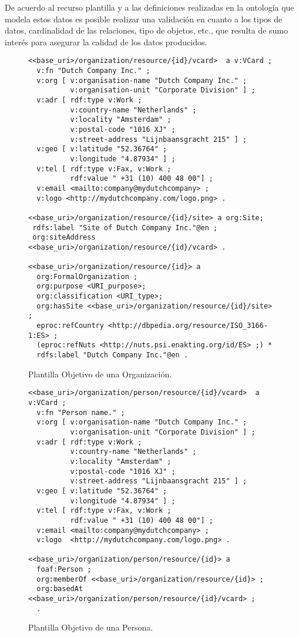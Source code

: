 De acuerdo al recurso plantilla y a las definiciones realizadas en la ontología que modela estos datos 
es posible realizar una validación en cuanto a los tipos de datos, cardinalidad de las relaciones, tipo de objetos, etc., que 
resulta de sumo interés para asegurar la calidad de los datos producidos.
\begin{figure}[!htp]
\begin{lstlisting} 
<<base_uri>/organization/resource/{id}/vcard>  a v:VCard ;
  v:fn "Dutch Company Inc." ;
  v:org [ v:organisation-name "Dutch Company Inc." ;
          v:organisation-unit "Corporate Division" ] ;
  v:adr [ rdf:type v:Work ;
          v:country-name "Netherlands" ;
          v:locality "Amsterdam" ;
          v:postal-code "1016 XJ" ;
          v:street-address "Lijnbaansgracht 215" ] ;
  v:geo [ v:latitude "52.36764" ;
          v:longitude "4.87934" ] ;
  v:tel [ rdf:type v:Fax, v:Work ;
          rdf:value " +31 (10) 400 48 00"] ; 
  v:email <mailto:company@mydutchcompany> ;
  v:logo <http://mydutchcompany.com/logo.png> .

<<base_uri>/organization/resource/{id}/site> a org:Site;
 rdfs:label "Site of Dutch Company Inc."@en ;
 org:siteAddress <<base_uri>/organization/resource/{id}/vcard> .

<<base_uri>/organization/resource/{id}> a 
  org:FormalOrganization ;   
  org:purpose <URI_purpose>;
  org:classification <URI_type>;
  org:hasSite <<base_uri>/organization/resource/{id}/site> ;
  eproc:refCountry <http://dbpedia.org/resource/ISO_3166-1:ES> ;
  (eproc:refNuts <http://nuts.psi.enakting.org/id/ES> ;) *
  rdfs:label "Dutch Company Inc."@en .
\end{lstlisting}
	\caption{Plantilla Objetivo de una Organización.}
	\label{fig:orgs-template}
\end{figure}


\begin{figure}[!htp]
\begin{lstlisting} 
<<base_uri>/organization/person/resource/{id}/vcard>  a v:VCard ;
  v:fn "Person name." ;
  v:org [ v:organisation-name "Dutch Company Inc." ;
          v:organisation-unit "Corporate Division" ] ;
  v:adr [ rdf:type v:Work ;
          v:country-name "Netherlands" ;
          v:locality "Amsterdam" ;
          v:postal-code "1016 XJ" ;
          v:street-address "Lijnbaansgracht 215" ] ;
  v:geo [ v:latitude "52.36764" ;
          v:longitude "4.87934" ] ;
  v:tel [ rdf:type v:Fax, v:Work ;
          rdf:value " +31 (10) 400 48 00"] ; 
  v:email <mailto:company@mydutchcompany> ;
  v:logo  <http://mydutchcompany.com/logo.png> .

<<base_uri>/organization/person/resource/{id}> a 
  foaf:Person ;
  org:memberOf <<base_uri>/organization/resource/{id}> ;
  org:basedAt <<base_uri>/organization/person/resource/{id}/vcard> ;  
  . 
\end{lstlisting}
	\caption{Plantilla Objetivo de una Persona.}
	\label{fig:person-template}
\end{figure}


